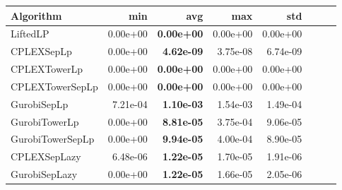 \begin{tabular}{lrrrrrrr}
Algorithm & min & avg & max & std
\\
\hline
LiftedLP&0.00e+00& \bf0.00e+00& 0.00e+00& 0.00e+00\\
CPLEXSepLp&0.00e+00& \bf4.62e-09& 3.75e-08& 6.74e-09\\
CPLEXTowerLp&0.00e+00& \bf0.00e+00& 0.00e+00& 0.00e+00\\
CPLEXTowerSepLp&0.00e+00& \bf0.00e+00& 0.00e+00& 0.00e+00\\
GurobiSepLp&7.21e-04& \bf1.10e-03& 1.54e-03& 1.49e-04\\
GurobiTowerLp&0.00e+00& \bf8.81e-05& 3.75e-04& 9.06e-05\\
GurobiTowerSepLp&0.00e+00& \bf9.94e-05& 4.00e-04& 8.90e-05\\
CPLEXSepLazy&6.48e-06& \bf1.22e-05& 1.70e-05& 1.91e-06\\
GurobiSepLazy&0.00e+00& \bf1.22e-05& 1.66e-05& 2.05e-06
\end{tabular}
